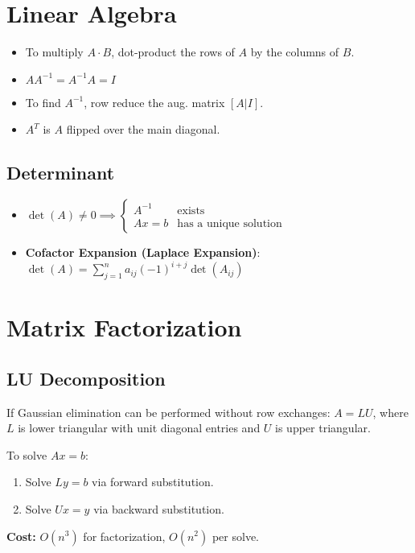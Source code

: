 \documentclass[9pt, letterpaper]{extarticle}
\begin{document}
\begin{multicols*}{3}
  \section{Linear Algebra}
  \begin{itemize}
    \item To multiply $A \cdot B$, dot-product the rows of $A$ by the columns of $B$.
    \item $A A^{-1} = A^{-1} A = I$
    \item To find $A^{-1}$, row reduce the aug. matrix $[A | I]$.
    \item $A^T$ is $A$ flipped over the main diagonal.
  \end{itemize}

  \subsection{Determinant}
  \begin{itemize}
    \item $\det(A) \neq 0 \implies \begin{cases}
        A^{-1} & \text{exists} \\
        Ax = b & \text{has a unique solution}
      \end{cases}$
    \item \textbf{Cofactor Expansion (Laplace Expansion)}:  
      $\det(A) = \sum_{j=1}^{n} a_{ij} (-1)^{i+j} \det(A_{ij})$

      
  \end{itemize}

  \section{Matrix Factorization}
  \subsection{LU Decomposition}
  If Gaussian elimination can be performed without row exchanges:
  $A = LU$,
  where $ L $ is lower triangular with unit diagonal entries and $ U $ is upper triangular.

  To solve $ Ax = b $:
  \begin{enumerate}
    \item Solve $ Ly = b $ via forward substitution.
    \item Solve $ Ux = y $ via backward substitution.
  \end{enumerate}
  \textbf{Cost:} $ O(n^3) $ for factorization, $ O(n^2) $ per solve.


\end{multicols*}
\end{document}
